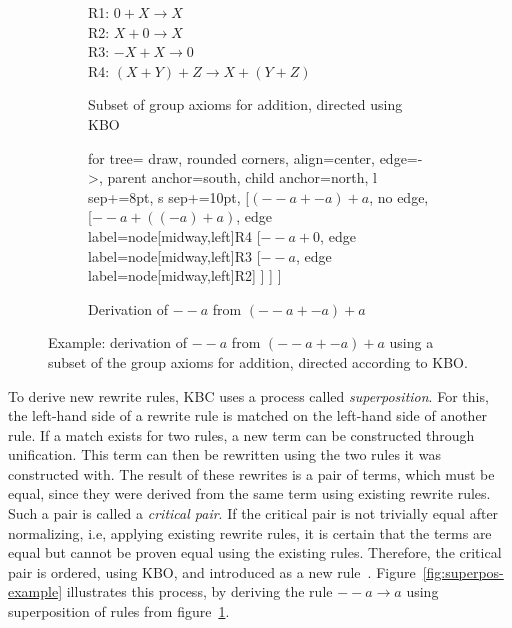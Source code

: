 \begin{figure}[h]
	\centering
	\hfill
	\begin{subfigure}[c]{0.55\textwidth}
		\vspace*{\fill} %
		R1: $0 + X \rightarrow X$\\
		R2: $X + 0 \rightarrow X$\\
		R3: $-X + X \rightarrow 0$\\
		R4: $(X +Y) + Z \rightarrow X + (Y + Z)$
		\vspace*{\fill}
		\caption{\scriptsize Subset of group axioms for addition, directed using KBO}
		\label{fig:kbc-sub1}
	\end{subfigure}
	\hfill
	\begin{subfigure}[c]{0.4\textwidth}
		\centering
		\begin{forest}
			for tree={
				draw,
				rounded corners,
				align=center,
				edge={->},
				parent anchor=south,
				child anchor=north,
				l sep+=8pt,
				s sep+=10pt,
			}
			[$(--a + -a) + a$, no edge,
			[$--a + ((-a) + a)$, edge label={node[midway,left]{R4}}
			[$--a + 0$, edge label={node[midway,left]{R3}}
			[$--a$, edge label={node[midway,left]{R2}}]
			]
			]
			]
		\end{forest}
		\caption{\scriptsize Derivation of $--a$ from $(--a + -a) + a$}
		\label{fig:kbc-sub2}
	\end{subfigure}
	
	\caption{Example: derivation of $--a$ from $(--a + -a) + a$ using a subset of the group axioms for addition, directed according to KBO.}
	\label{fig:kbc-example}
\end{figure}

To derive new rewrite rules, KBC uses a process called \emph{superposition}. For this, the left-hand side of a rewrite rule is matched on the left-hand side of another rule. If a match exists for two rules, a new term can be constructed through unification. This term can then be rewritten using the two rules it was constructed with. The result of these rewrites is a pair of terms, which must be equal, since they were derived from the same term using existing rewrite rules. Such a pair is called a \emph{critical pair}. If the critical pair is not trivially equal after normalizing, i.e, applying existing rewrite rules, it is certain that the terms are equal but cannot be proven equal using the existing rules. Therefore, the critical pair is ordered, using KBO, and introduced as a new rule~\citep{10.1093/comjnl/34.1.2}. Figure~\ref{fig:superpos-example} illustrates this process, by deriving the rule $--a \to a$ using superposition of rules from figure~\ref{fig:kbc-sub1}.

